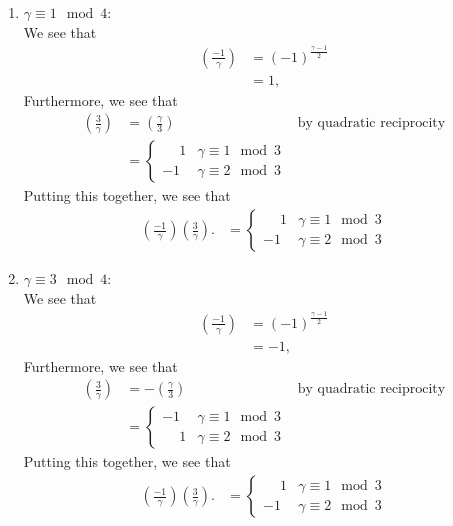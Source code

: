 \documentclass[12 pt]{amsart}
\begin{document}
  \begin{enumerate}
  \item $\gamma \equiv 1 \mod 4$: \\
    We see that 
    \begin{align*}
      \left( \frac{-1}{\gamma} \right) &= (-1)^{\frac{\gamma - 1}{2}} \\
                                       &= 1,
    \end{align*}
    Furthermore, we see that 
    \begin{align*}
      \left( \frac{3}{\gamma} \right) &= \left( \frac{\gamma}{3} \right) 
                                          & \text{by quadratic reciprocity} \\
                                      &= \begin{cases} 
                                          \phantom{-}1 & \gamma \equiv 1 \mod 3 \\ 
                                          -1 & \gamma \equiv 2 \mod 3 
                                         \end{cases}
    \end{align*}
    Putting this together, we see that 
    \begin{align*}
      \left( \frac{-1}{\gamma} \right)
      \left( \frac{3}{\gamma} \right).
      &= 
        \begin{cases} 
        \phantom{-}1 & \gamma \equiv 1 \mod 3 \\ 
        -1 & \gamma \equiv 2 \mod 3 
        \end{cases}
    \end{align*}
  \item $\gamma \equiv 3 \mod 4$: \\
    We see that 
    \begin{align*}
      \left( \frac{-1}{\gamma} \right) &= (-1)^{\frac{\gamma - 1}{2}} \\
                                       &= -1,
    \end{align*}
    Furthermore, we see that 
    \begin{align*}
      \left( \frac{3}{\gamma} \right) &= -\left( \frac{\gamma}{3} \right) 
                                          & \text{by quadratic reciprocity} \\
                                      &= \begin{cases} 
                                          -1 & \gamma \equiv 1 \mod 3 \\ 
                                          \phantom{-}1 & \gamma \equiv 2 \mod 3 
                                         \end{cases}
    \end{align*}
    Putting this together, we see that 
    \begin{align*}
      \left( \frac{-1}{\gamma} \right)
      \left( \frac{3}{\gamma} \right).
      &= 
        \begin{cases} 
        \phantom{-}1 & \gamma \equiv 1 \mod 3 \\ 
        -1 & \gamma \equiv 2 \mod 3 
        \end{cases}
    \end{align*}
  \end{enumerate}
\end{document}
